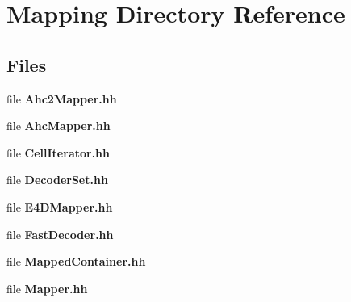\section{Mapping Directory Reference}
\label{dir_dbabde7df75548d3bca6219291660632}
\subsection*{Files}
\begin{DoxyCompactItemize}
\item 
file {\bfseries Ahc2\-Mapper.\-hh}
\item 
file {\bfseries Ahc\-Mapper.\-hh}
\item 
file {\bfseries Cell\-Iterator.\-hh}
\item 
file {\bfseries Decoder\-Set.\-hh}
\item 
file {\bfseries E4\-D\-Mapper.\-hh}
\item 
file {\bfseries Fast\-Decoder.\-hh}
\item 
file {\bfseries Mapped\-Container.\-hh}
\item 
file {\bfseries Mapper.\-hh}
\end{DoxyCompactItemize}
